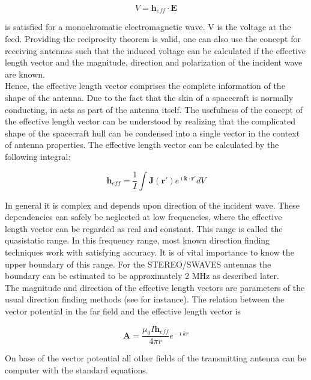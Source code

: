 \documentclass[galley,ras]{agu2001}
\begin{document}
\begin{article}
\begin{equation}
 V=\textbf{h}_{eff}\cdot \textbf{E}
 \end{equation}

is satisfied for a monochromatic electromagnetic wave. V is the voltage at the feed. Providing the reciprocity theorem is valid, one can also use the concept for receiving antennas such that the induced voltage can be calculated if the effective length vector and the magnitude, direction and polarization of the incident wave are known.\\

Hence, the effective length vector comprises the complete information of the shape of the antenna. Due to the fact that the skin of a spacecraft is normally conducting, in acts as part of the antenna itself. The usefulness of the concept of the effective length vector can be understood by realizing that the complicated shape of the spacecraft hull can be condensed into a single vector in the context of antenna properties. The effective length vector can be calculated by the following integral:

\begin{equation}
\textbf{h}_{eff}=\frac{1}{I}\int \mathbf{J}(\mathbf{r}')e^{\imath \mathbf{k} \cdot \mathbf{r}'} dV
 \end{equation}

In general it is complex and depends upon direction of the incident wave. These dependencies can safely be neglected at low frequencies, where the effective length vector can be regarded as real and constant. This range is called the quasistatic range. In this frequency range, most known direction finding techniques work with satisfying accuracy. It is of vital importance to know the upper boundary of this range. For the STEREO/SWAVES antennas the boundary can be estimated to be approximately 2 MHz as described later.\\

The magnitude and direction of the effective length vectors are parameters of the usual direction finding methods (see \cite{cecconi05} for instance). The relation between the vector potential in the far field and the effective length vector is

\begin{equation}
  \mathbf{A} = \frac{\mu_0 I \textbf{h}_{eff}}{4 \pi r}e^{-\imath k r}
\end{equation}

On base of the vector potential all other fields of the transmitting antenna can be computer with the standard equations.\\


\end{article}
\end{document}
